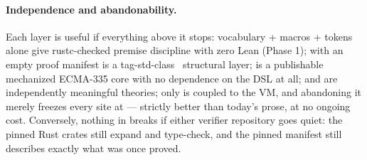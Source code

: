 \paragraph{Independence and abandonability.} Each layer is useful if
everything above it stops: vocabulary + macros + tokens alone give
rustc-checked premise discipline with zero Lean (Phase 1);
 with an empty proof manifest is a
tag-std-class~\cite{tagstd2025} structural layer;  is a
publishable mechanized ECMA-335 core with no dependence on the DSL at
all;  and  are independently
meaningful theories; only  is coupled to the VM,
and abandoning it merely freezes every site at  ---
strictly better than today's prose, at no ongoing cost. Conversely,
nothing in \dotnetrs{} breaks if either verifier repository goes quiet:
the pinned Rust crates still expand and type-check, and the pinned
manifest still describes exactly what was once proved.
